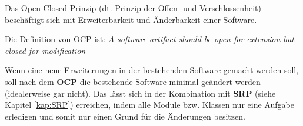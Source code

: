 Das Open-Closed-Prinzip (dt. Prinzip der Offen- und Verschlossenheit) beschäftigt sich 
mit Erweiterbarkeit und Änderbarkeit einer Software.

Die Definition von OCP ist:
\textit{A software artifact should be open for extension but 
closed for modification}\cite[70]{cleanArchitecture}

Wenn eine neue Erweiterungen in der bestehenden Software gemacht werden soll, 
soll nach dem \textbf{OCP} die bestehende Software minimal geändert werden 
(idealerweise gar nicht). Das lässt sich in der Kombination mit \textbf{SRP} (siehe Kapitel \ref{kap:SRP})
erreichen, indem alle Module bzw. Klassen nur eine Aufgabe erledigen und somit 
nur einen Grund für die Änderungen besitzen.
